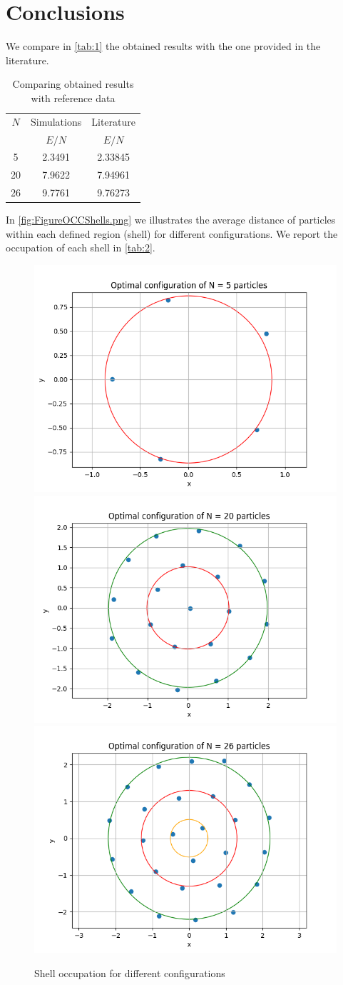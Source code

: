 \documentclass{article}
\begin{document}
\section{Conclusions}
We compare in \autoref{tab:1} the obtained results with the one provided in the literature.
\begin{table}[H]
    \centering
    \begin{tabular}{|c|c|c|}
        \hline
        $N$& Simulations & Literature \\
        &$E/N$ & $E/N$ \\\hline\hline
        5 & 2.3491 & 2.33845 \\\hline
        20 & 7.9622 & 7.94961 \\\hline
        26 & 9.7761 & 9.76273 \\\hline
    \end{tabular}
    \caption{Comparing obtained results with reference data}
    \label{tab:1}
\end{table}
\noindent In \autoref{fig:FigureOCCShells.png} we illustrates the average distance of particles within each defined region (shell) for different configurations. We report the occupation of each shell in \autoref{tab:2}.
\begin{figure}[H]
    \centering
    \includegraphics[width=0.495\linewidth]{images/Figure_5.png}
    \includegraphics[width=0.495\linewidth]{images/Figure_20.png}
    \includegraphics[width=0.495\linewidth]{images/Figure_26.png}
    \caption{Shell occupation for different configurations}
    \label{fig:FigureOCCShells.png}
\end{figure}
\end{document}
